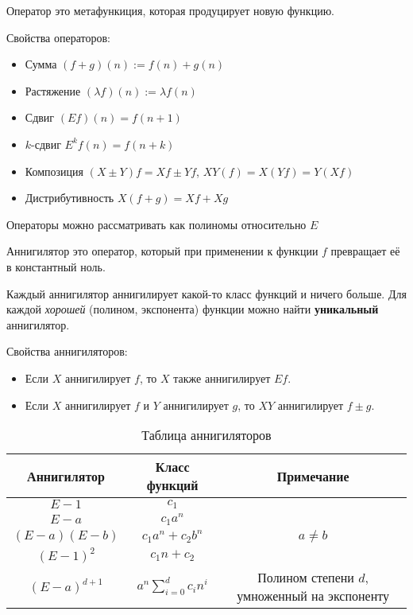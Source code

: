 
\begin{definition}
  Оператор это метафункиция, которая продуцирует новую функцию.
\end{definition}

Свойства операторов:

\begin{itemize}
  \item Сумма \((f + g)(n) := f(n) + g(n)\)
  \item Растяжение \((\lambda f)(n) := \lambda f(n)\)
  \item Сдвиг \((E f)(n) = f(n + 1)\)
  \item \(k\)-сдвиг \(E^{k} f(n) = f(n + k)\)
  \item Композиция \((X \pm Y)f = Xf \pm Yf\), \(XY(f) = X(Yf) = Y(Xf)\)
  \item Дистрибутивность \(X(f + g) = Xf + Xg\)
\end{itemize}

Операторы можно рассматривать как полиномы относительно \(E\)

\begin{definition}
  Аннигилятор это оператор, который при применении к функции \(f\) превращает её
  в константный ноль.
\end{definition}

Каждый аннигилятор аннигилирует какой-то класс функций и ничего больше. Для
каждой \textit{хорошей} (полином, экспонента) функции можно найти
\textbf{уникальный} аннигилятор.

Свойства аннигиляторов:
\begin{itemize}
  \item Если \(X\) аннигилирует \(f\), то \(X\) также аннигилирует \(Ef\).
  \item Если \(X\) аннигилирует \(f\) и \(Y\) аннигилирует \(g\), то \(XY\)
  аннигилирует \(f \pm g\).
\end{itemize}

\begin{table}[H]
  \centering

  \renewcommand{\arraystretch}{1.5}
  \begin{tabular}{c|c|c}
    Аннигилятор & Класс функций & Примечание \\
    \hline
    \(E - 1\) & \(c_{1}\) & \\
    \(E - a\) & \(c_{1} a^{n}\) & \\
    \((E - a)(E - b)\) & \(c_{1} a^{n} + c_{2} b^{n}\) & \(a \neq b\) \\
    \((E - 1)^2\) & \(c_{1} n + c_{2}\) & \\
    \((E - a)^{d + 1}\) & \(a^{n} \sum_{i = 0}^{d} c_{i} n^{i}\) &
      Полином степени \(d\), умноженный на экспоненту
  \end{tabular}\caption*{Таблица аннигиляторов}
\end{table}


